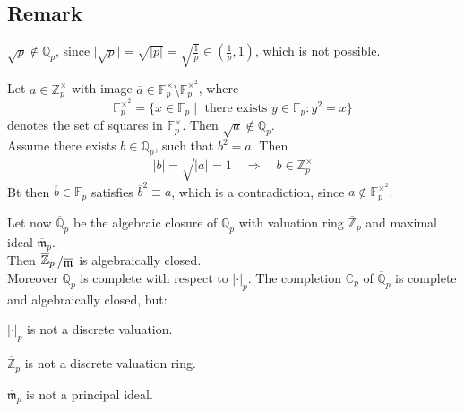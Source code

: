 \documentclass[12pt]{book}
\newcommand{\slant}[2]{{\raisebox{.1em}{$#1$}\left/\raisebox{-.1em}{$#2$}\right.}}
\begin{document}
\begin{spacing}{1.3}
\subsection{Remark}%
\begin{compactenum}
\item $\sqrt{p} \notin \mathbb{Q}_p$, since $\vert \sqrt{p} \vert = \sqrt{\vert p \vert }= \sqrt{\frac{1}{p}} \in \left(\frac{1}{p}, 1\right)$, which is not possible.
\item Let $a \in \mathbb{Z}_p^{\times}$ with image $\overline{a} \in \mathbb{F}_p^{\times} \setminus \mathbb{F}_p^{\times^2}$, where $$\mathbb{F}_p^{\times^2}=\{x \in \mathbb{F}_p \mid \textrm{ there exists } y \in \mathbb{F}_p: y^2=x \}$$
denotes the set of squares in $\mathbb{F}_p^{\times}$. Then $\sqrt{a} \notin \mathbb{Q}_p$.\\
Assume there exists $b \in \mathbb{Q}_p$, such that $b^2=a$. Then 
$$\vert b \vert = \sqrt{\vert a \vert } =1 \quad \Rightarrow \quad b \in \mathbb{Z}_p^{\times}$$
Bt then $\overline{b} \in \mathbb{F}_p$ satisfies $\overline{b}^2\equiv a$, which is a contradiction, since $a \notin \mathbb{F}_p^{\times^2}$.
\item Let now $\overline{\mathbb{Q}}_p$ be the algebraic closure of $\mathbb{Q}_p$ with valuation ring $\overline{\mathbb{Z}}_p$ and maximal ideal $\overline{\mathfrak{m}}_p$.\\
Then $\slant{\overline{\mathbb{Z}}_p}{\overline{\mathfrak{m}}}$ is algebraically closed.\\
Moreover $\mathbb{Q}_p$ is complete with respect to $|\cdot|_p$. The completion $\mathbb{C}_p$ of $\overline{\mathbb{Q}}_p$ is complete and algebraically closed, but:
\begin{compactenum}
\item $|\cdot|_p$ is not a discrete valuation.
\item $\overline{\mathbb{Z}}_p$ is not a discrete valuation ring.
\item $\overline{\mathfrak{m}}_p$ is not a principal ideal.
\end{compactenum}
\end{compactenum}



\end{spacing}
\end{document}
